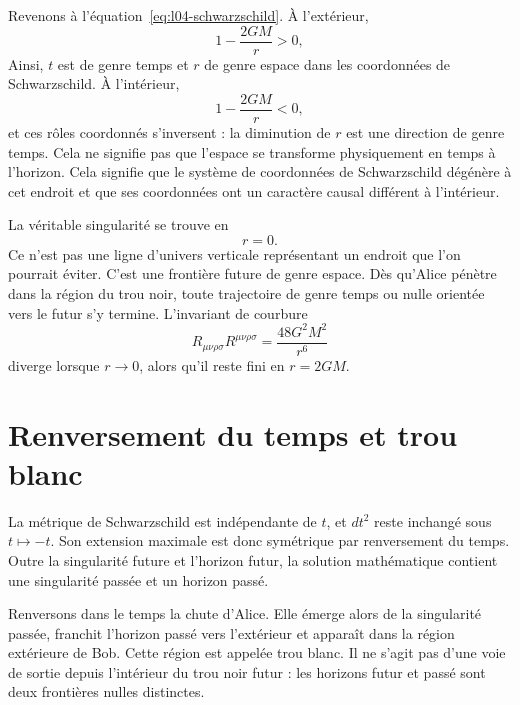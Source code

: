 Revenons à l’équation~\eqref{eq:l04-schwarzschild}. À l’extérieur,
\begin{equation}
1-\frac{2GM}{r}>0,
\end{equation}
Ainsi, \(t\) est de genre temps et \(r\) de genre espace dans les coordonnées de Schwarzschild. À l’intérieur,
\begin{equation}
1-\frac{2GM}{r}<0,
\end{equation}
et ces rôles coordonnés s’inversent : la diminution de \(r\) est une direction de genre temps. Cela ne signifie pas que l’espace se transforme physiquement en temps à l’horizon. Cela signifie que le système de coordonnées de Schwarzschild dégénère à cet endroit et que ses coordonnées ont un caractère causal différent à l’intérieur.

La véritable singularité se trouve en
\begin{equation}
r=0.
\end{equation}
Ce n’est pas une ligne d’univers verticale représentant un endroit que l’on pourrait éviter. C’est une frontière future de genre espace. Dès qu’Alice pénètre dans la région du trou noir, toute trajectoire de genre temps ou nulle orientée vers le futur s’y termine. L’invariant de courbure
\begin{equation}
R_{\mu\nu\rho\sigma}R^{\mu\nu\rho\sigma}
=\frac{48G^2M^2}{r^6}
\label{eq:l04-kretschmann}
\end{equation}
diverge lorsque \(r\to0\), alors qu’il reste fini en \(r=2GM\).

\section{Renversement du temps et trou blanc}

La métrique de Schwarzschild est indépendante de \(t\), et \(dt^2\) reste inchangé sous \(t\mapsto-t\). Son extension maximale est donc symétrique par renversement du temps. Outre la singularité future et l’horizon futur, la solution mathématique contient une singularité passée et un horizon passé.

Renversons dans le temps la chute d’Alice. Elle émerge alors de la singularité passée, franchit l’horizon passé vers l’extérieur et apparaît dans la région extérieure de Bob. Cette région est appelée trou blanc. Il ne s’agit pas d’une voie de sortie depuis l’intérieur du trou noir futur : les horizons futur et passé sont deux frontières nulles distinctes.

